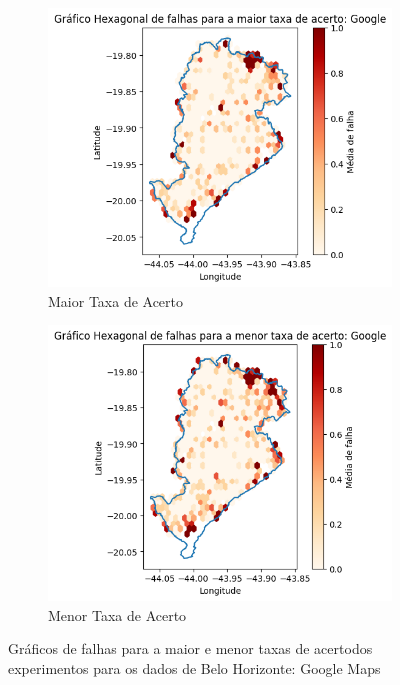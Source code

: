 \begin{figure}[ht]
  \centering
  \begin{subfigure}[b]{0.45\textwidth}
    \includegraphics[width=\textwidth]{Figuras/expFalhasGooglemaior.png}
    \caption{Maior Taxa de Acerto}
    \label{fig:falhasgoogleBHexpMaior}
  \end{subfigure}
  \hfill
  \begin{subfigure}[b]{0.45\textwidth}
    \includegraphics[width=\textwidth]{Figuras/expFalhasGooglemenor.png}
    \caption{Menor Taxa de Acerto}
    \label{fig:falhasgoogleBHexpMenor}
  \end{subfigure}
  
  \caption{Gráficos de falhas para a maior e menor taxas de acertodos experimentos para os dados de Belo Horizonte: Google Maps}
  \label{fig:falhas-exp-google-bh}
\end{figure}


